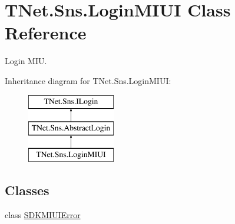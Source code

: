\hypertarget{class_t_net_1_1_sns_1_1_login_m_i_u_i}{}\section{T\+Net.\+Sns.\+Login\+M\+I\+UI Class Reference}
\label{class_t_net_1_1_sns_1_1_login_m_i_u_i}


Login M\+IU.  


Inheritance diagram for T\+Net.\+Sns.\+Login\+M\+I\+UI\+:\begin{figure}[H]
\begin{center}
\leavevmode
\includegraphics[height=3.000000cm]{class_t_net_1_1_sns_1_1_login_m_i_u_i}
\end{center}
\end{figure}
\subsection*{Classes}
\begin{DoxyCompactItemize}
\item 
class \mbox{\hyperlink{class_t_net_1_1_sns_1_1_login_m_i_u_i_1_1_s_d_k_m_i_u_i_error}{S\+D\+K\+M\+I\+U\+I\+Error}}
\end{DoxyCompactItemize}
